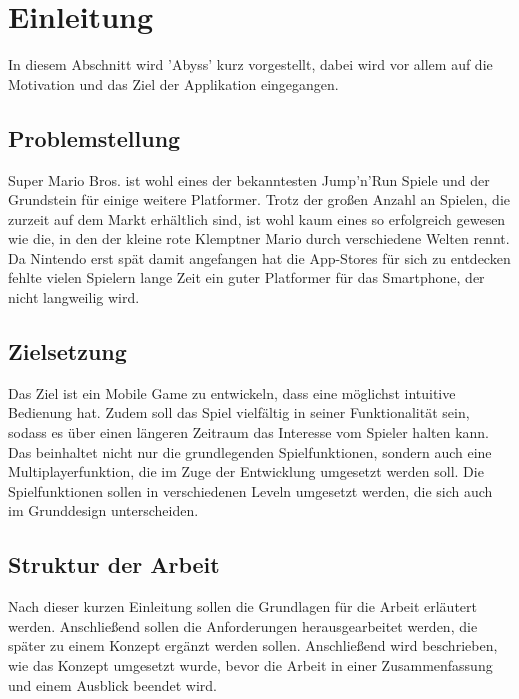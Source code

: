 \chapter{Einleitung}
\label{cha:einleitung}
In diesem Abschnitt wird 'Abyss' kurz vorgestellt, dabei wird vor allem auf 
die Motivation und das Ziel der Applikation eingegangen.

\section{Problemstellung}
\label{sec:einleitung:problemstellung}
Super Mario Bros. \cite{mario} ist wohl eines der bekanntesten Jump'n'Run Spiele und
der Grundstein für einige weitere Platformer. Trotz der großen Anzahl an Spielen,
die zurzeit auf dem Markt erhältlich sind, ist wohl kaum eines so erfolgreich gewesen
wie die, in den der kleine rote Klemptner Mario durch verschiedene Welten rennt. \newline
Da Nintendo erst spät damit angefangen hat die App-Stores für sich zu entdecken 
fehlte vielen Spielern lange Zeit ein guter Platformer für das Smartphone, 
der nicht langweilig wird.


\section{Zielsetzung}
\label{sec:einleitung:zielsetzung}
Das Ziel ist ein Mobile Game zu entwickeln, dass eine möglichst intuitive Bedienung
hat. Zudem soll das Spiel vielfältig in seiner Funktionalität sein, sodass es 
über einen längeren Zeitraum das Interesse vom Spieler halten kann. \newline
Das beinhaltet nicht nur die grundlegenden Spielfunktionen, sondern auch eine 
Multiplayerfunktion, die im Zuge der Entwicklung umgesetzt werden soll. 
Die Spielfunktionen sollen in verschiedenen Leveln umgesetzt werden, die sich 
auch im Grunddesign unterscheiden.

\section{Struktur der Arbeit}
\label{sec:einleitung:struktur}
Nach dieser kurzen Einleitung sollen die Grundlagen für die Arbeit erläutert werden.
Anschließend sollen die Anforderungen herausgearbeitet werden, die später zu einem Konzept 
ergänzt werden sollen. Anschließend wird beschrieben, wie das Konzept umgesetzt wurde, bevor
die Arbeit in einer Zusammenfassung und einem Ausblick beendet wird.